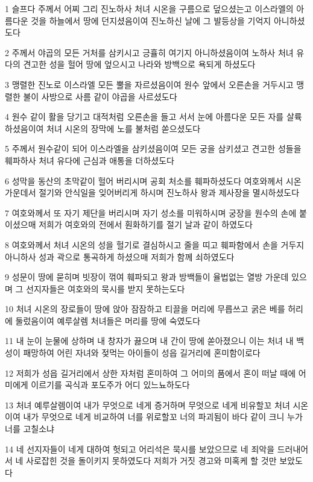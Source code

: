 \par 1 슬프다 주께서 어찌 그리 진노하사 처녀 시온을 구름으로 덮으셨는고 이스라엘의 아름다운 것을 하늘에서 땅에 던지셨음이여 진노하신 날에 그 발등상을 기억지 아니하셨도다
\par 2 주께서 야곱의 모든 거처를 삼키시고 긍휼히 여기지 아니하셨음이여 노하사 처녀 유다의 견고한 성을 헐어 땅에 엎으시고 나라와 방백으로 욕되게 하셨도다
\par 3 맹렬한 진노로 이스라엘 모든 뿔을 자르셨음이여 원수 앞에서 오른손을 거두시고 맹렬한 불이 사방으로 사름 같이 야곱을 사르셨도다
\par 4 원수 같이 활을 당기고 대적처럼 오른손을 들고 서서 눈에 아름다운 모든 자를 살륙하셨음이여 처녀 시온의 장막에 노를 불처럼 쏟으셨도다
\par 5 주께서 원수같이 되어 이스라엘을 삼키셨음이여 모든 궁을 삼키셨고 견고한 성들을 훼파하사 처녀 유다에 근심과 애통을 더하셨도다
\par 6 성막을 동산의 초막같이 헐어 버리시며 공회 처소를 훼파하셨도다 여호와께서 시온 가운데서 절기와 안식일을 잊어버리게 하시며 진노하사 왕과 제사장을 멸시하셨도다
\par 7 여호와께서 또 자기 제단을 버리시며 자기 성소를 미워하시며 궁장을 원수의 손에 붙이셨으매 저희가 여호와의 전에서 훤화하기를 절기 날과 같이 하였도다
\par 8 여호와께서 처녀 시온의 성을 헐기로 결심하시고 줄을 띠고 훼파함에서 손을 거두지 아니하사 성과 곽으로 통곡하게 하셨으매 저희가 함께 쇠하였도다
\par 9 성문이 땅에 묻히며 빗장이 꺾여 훼파되고 왕과 방백들이 율법없는 열방 가운데 있으며 그 선지자들은 여호와의 묵시를 받지 못하는도다
\par 10 처녀 시온의 장로들이 땅에 앉아 잠잠하고 티끌을 머리에 무릅쓰고 굵은 베를 허리에 둘렀음이여 예루살렘 처녀들은 머리를 땅에 숙였도다
\par 11 내 눈이 눈물에 상하며 내 창자가 끓으며 내 간이 땅에 쏟아졌으니 이는 처녀 내 백성이 패망하여 어린 자녀와 젖먹는 아이들이 성읍 길거리에 혼미함이로다
\par 12 저희가 성읍 길거리에서 상한 자처럼 혼미하여 그 어미의 품에서 혼이 떠날 때에 어미에게 이르기를 곡식과 포도주가 어디 있느뇨하도다
\par 13 처녀 예루살렘이여 내가 무엇으로 네게 증거하며 무엇으로 네게 비유할꼬 처녀 시온이여 내가 무엇으로 네게 비교하여 너를 위로할꼬 너의 파괴됨이 바다 같이 크니 누가 너를 고칠소냐
\par 14 네 선지자들이 네게 대하여 헛되고 어리석은 묵시를 보았으므로 네 죄악을 드러내어서 네 사로잡힌 것을 돌이키지 못하였도다 저희가 거짓 경고와 미혹케 할 것만 보았도다

